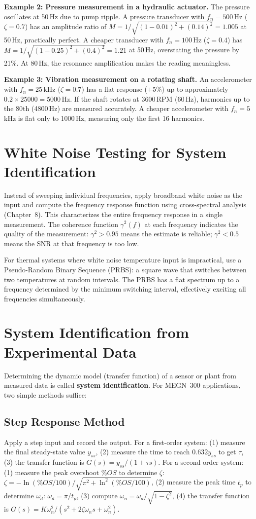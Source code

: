 \documentclass[11pt,letterpaper,twoside,openany]{book}
\begin{document}
\textbf{Example 2: Pressure measurement in a hydraulic actuator.} The pressure oscillates at 50\,Hz due to pump ripple. A pressure transducer with $f_n = 500$\,Hz ($\zeta = 0.7$) has an amplitude ratio of $M = 1/\sqrt{(1-0.01)^2 + (0.14)^2} = 1.005$ at 50\,Hz, practically perfect. A cheaper transducer with $f_n = 100$\,Hz ($\zeta = 0.4$) has $M = 1/\sqrt{(1-0.25)^2 + (0.4)^2} = 1.21$ at 50\,Hz, overstating the pressure by 21\%. At 80\,Hz, the resonance amplification makes the reading meaningless.

\textbf{Example 3: Vibration measurement on a rotating shaft.} An accelerometer with $f_n = 25$\,kHz ($\zeta = 0.7$) has a flat response ($\pm$5\%) up to approximately $0.2 \times 25000 = 5000$\,Hz. If the shaft rotates at 3600\,RPM (60\,Hz), harmonics up to the 80th (4800\,Hz) are measured accurately. A cheaper accelerometer with $f_n = 5$\,kHz is flat only to 1000\,Hz, measuring only the first 16 harmonics.

\section{White Noise Testing for System Identification}
Instead of sweeping individual frequencies, apply broadband white noise as the input and compute the frequency response function using cross-spectral analysis (Chapter~8). This characterizes the entire frequency response in a single measurement. The coherence function $\gamma^2(f)$ at each frequency indicates the quality of the measurement: $\gamma^2 > 0.95$ means the estimate is reliable; $\gamma^2 < 0.5$ means the SNR at that frequency is too low.

For thermal systems where white noise temperature input is impractical, use a Pseudo-Random Binary Sequence (PRBS): a square wave that switches between two temperatures at random intervals. The PRBS has a flat spectrum up to a frequency determined by the minimum switching interval, effectively exciting all frequencies simultaneously.
\section{System Identification from Experimental Data}
Determining the dynamic model (transfer function) of a sensor or plant from measured data is called \textbf{system identification}. For MEGN~300 applications, two simple methods suffice:

\subsection{Step Response Method}
Apply a step input and record the output. For a first-order system: (1) measure the final steady-state value $y_{ss}$, (2) measure the time to reach $0.632 y_{ss}$ to get $\tau$, (3) the transfer function is $G(s) = y_{ss}/(1 + \tau s)$. For a second-order system: (1) measure the peak overshoot $\%OS$ to determine $\zeta$: $\zeta = -\ln(\%OS/100)/\sqrt{\pi^2 + \ln^2(\%OS/100)}$, (2) measure the peak time $t_p$ to determine $\omega_d$: $\omega_d = \pi/t_p$, (3) compute $\omega_n = \omega_d/\sqrt{1-\zeta^2}$, (4) the transfer function is $G(s) = K\omega_n^2/(s^2 + 2\zeta\omega_n s + \omega_n^2)$.
\end{document}
